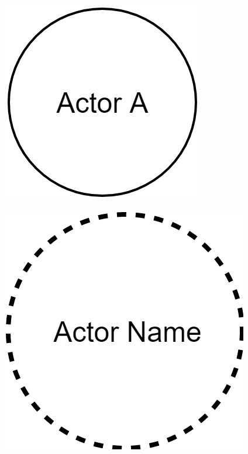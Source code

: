 \begin{figure}
    \centering
    \begin{minipage}{.5\textwidth}
      \centering
      \includegraphics[width=.5\linewidth]{gfx/actor/longLiveActor}
      \label{fig:actor:diagram:longLiveActor}
    \end{minipage}%
    \begin{minipage}{.5\textwidth}
      \centering
      \includegraphics[width=.5\linewidth]{gfx/actor/shortLiveActor}
      \label{fig:actor:diagram:shortLiveActor}
    \end{minipage}
\end{figure}  

